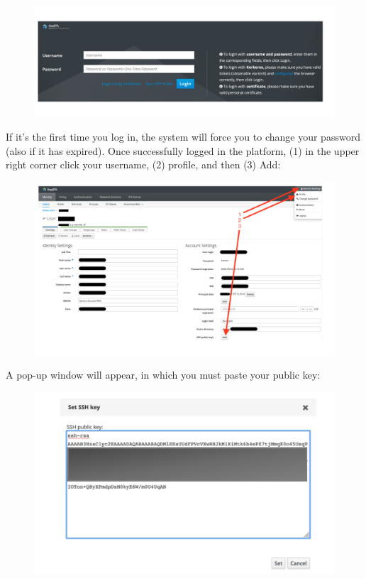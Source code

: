 \begin{figure}
  \includegraphics[width=15cm]{Images/example12.png}
\end{figure}


If it’s the first time you log in, the system will force you to change your password (also if it has expired).
Once successfully logged in the platform, (1) in the upper right corner click your username, (2) profile, and
then (3) Add:


\begin{figure}
  \includegraphics[width=15cm]{Images/example13.png}
\end{figure}

\newpage

A pop-up window will appear, in which you must paste your public key:

\begin{figure}
  \includegraphics[width=15cm]{Images/example14.png}
\end{figure}

